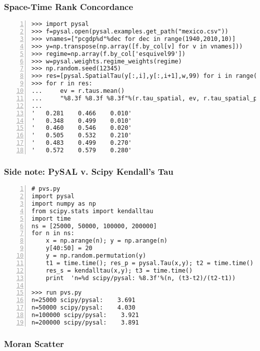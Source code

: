 \documentclass{beamer}
\begin{document}
\begin{frame}[fragile]
  \frametitle{Space-Time Rank Concordance}
  \begin{footnotesize}
  \begin{Verbatim}[numbers=left]
>>> import pysal
>>> f=pysal.open(pysal.examples.get_path("mexico.csv"))
>>> vnames=["pcgdp%d"%dec for dec in range(1940,2010,10)]
>>> y=np.transpose(np.array([f.by_col[v] for v in vnames]))
>>> regime=np.array(f.by_col['esquivel99'])
>>> w=pysal.weights.regime_weights(regime)
>>> np.random.seed(12345)
>>> res=[pysal.SpatialTau(y[:,i],y[:,i+1],w,99) for i in range(6)]
>>> for r in res:
...     ev = r.taus.mean()
...     "%8.3f %8.3f %8.3f"%(r.tau_spatial, ev, r.tau_spatial_psim)
...     
'   0.281    0.466    0.010'
'   0.348    0.499    0.010'
'   0.460    0.546    0.020'
'   0.505    0.532    0.210'
'   0.483    0.499    0.270'
'   0.572    0.579    0.280'
\end{Verbatim} 
\end{footnotesize}
\end{frame}

\begin{frame}[fragile]
  \frametitle{Side note: PySAL v. Scipy Kendall's Tau}
  \begin{footnotesize}
  \begin{Verbatim}[numbers=left]
# pvs.py
import pysal
import numpy as np
from scipy.stats import kendalltau
import time
ns = [25000, 50000, 100000, 200000]
for n in ns:
    x = np.arange(n); y = np.arange(n)
    y[40:50] = 20
    y = np.random.permutation(y)
    t1 = time.time(); res_p = pysal.Tau(x,y); t2 = time.time()
    res_s = kendalltau(x,y); t3 = time.time()
    print  'n=%d scipy/pysal: %8.3f'%(n, (t3-t2)/(t2-t1))

>>> run pvs.py
n=25000 scipy/pysal:    3.691
n=50000 scipy/pysal:    4.030
n=100000 scipy/pysal:    3.921
n=200000 scipy/pysal:    3.891
\end{Verbatim} 
\end{footnotesize}
\end{frame}
\begin{frame}\frametitle{Moran Scatter}

\begin{center}
     \begin{figure}
      \end{figure}      
\end{center}
  
\end{frame}
\end{document}
